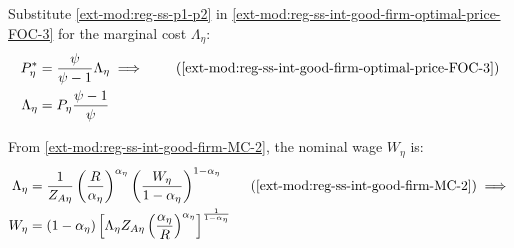 \documentclass[../thesis.tex]{subfiles}
\begin{document}
Substitute \ref{ext-mod:reg-ss-p1-p2} in \ref{ext-mod:reg-ss-int-good-firm-optimal-price-FOC-3} for the marginal cost $\Lambda_{\eta}$:
\begin{align}
	P_{\eta}^{\ast} &= \frac{\psi}{\psi-1} \Lambda_{\eta} \implies \tag{\ref{ext-mod:reg-ss-int-good-firm-optimal-price-FOC-3}} \\
	\Lambda_{\eta} &= P_{\eta} \frac{\psi-1}{\psi} \label{ext-mod:reg-ss-marginal-cost}
\end{align}

From \ref{ext-mod:reg-ss-int-good-firm-MC-2}, the nominal wage $W_{\eta}$ is:
\begin{alignat}{2}
	\Lambda_{\eta} &= \frac{1}{Z_{A\eta}} \left( \frac{R_{}}{{\alpha_{\eta}}} \right)^{{\alpha_{\eta}}} \left( \frac{W_{\eta}}{1-\alpha_{\eta}} \right)^{1-\alpha_{\eta}} \tag{\ref{ext-mod:reg-ss-int-good-firm-MC-2}} \implies \\
	W_{\eta} &= \left( 1 - \alpha_{\eta} \right) \left[ \Lambda_{\eta} Z_{A\eta} \left( \frac{\alpha_{\eta}}{R} \right)^{\alpha_{\eta}} \right]^{\frac{1}{1 - \alpha_{\eta}}} \label{ext-mod:reg-ss-nominal-wage}
\end{alignat}

\begin{comment}
	Substitute \ref{ext-mod:reg-ss-nominal-wage} in \ref{ext-mod:reg-ss-int-good-firm-MC-2} for the technology level of region 2, $Z_{A2}$:
	\begin{align}
		\Lambda_{\eta} &= \frac{1}{Z_{A\eta}} \left( \frac{R_K}{{\alpha_{\eta}}} \right)^{{\alpha_{\eta}}} \left( \frac{W}{1-\alpha_{\eta}} \right)^{1-\alpha_{\eta}} \implies \tag{\ref{ext-mod:reg-ss-int-good-firm-MC-2}} \\
		Z_{A2} &= \frac{1}{\Lambda_{}} \left( \frac{R_K}{{\alpha_{\eta}}} \right)^{{\alpha_{\eta}}} \left( \frac{W}{1-\alpha_{\eta}} \right)^{1-\alpha_{\eta}} \label{ext-mod:reg-ss-za2}
	\end{align}
\end{comment}
\end{document}
